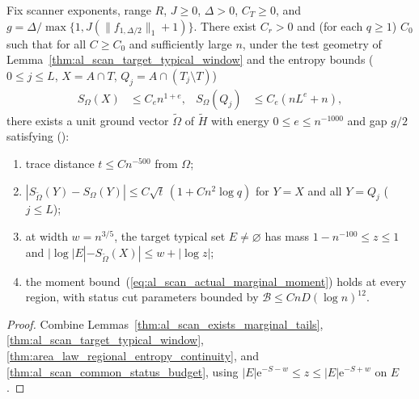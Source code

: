 \begin{lemma}
    \label{thm:al_scan_truncation_inputs}
    \leanok
    Fix scanner exponents, range $R$, $J\ge0$, $\Delta>0$, $C_T\ge0$, and
    $g=\Delta/\max\{1,J(\|f_{1,\Delta/2}\|_1+1)\}$. There exist $C_r>0$ and (for
    each $q\ge1$) $C_0$ such that for all $C\ge C_0$ and sufficiently large $n$,
    under the test geometry of Lemma~\ref{thm:al_scan_target_typical_window}
    and the entropy bounds ($0\le j\le L$, $X=A\cap T$,
    $Q_j=A\cap(T_j\setminus T)$)
    \begin{align}
        S_\Omega(X)   & \le C_en^{1+e},  &
        S_\Omega(Q_j) & \le C_e(nL^e+n),
        \label{eq:al_scan_truncation_entropy_inputs}
    \end{align}
    there exists a unit ground vector $\widetilde\Omega$ of $\widetilde H$ with
    energy $0\le e\le n^{-1000}$ and gap $g/2$ satisfying
    (\cite[Proposition~4.5, Lemmas~2.1 and~3.1, and Proposition~9.2]{OpenAI2026AreaLaw}):
    \begin{enumerate}
        \item trace distance $t\le Cn^{-500}$ from $\Omega$;
        \item $|S_{\widetilde\Omega}(Y)-S_\Omega(Y)|\le C\sqrt t\,(1+Cn^2\log q)$
              for $Y=X$ and all $Y=Q_j$ ($j\le L$);
        \item at width $w=n^{3/5}$, the target typical set $E\ne\varnothing$ has
              mass $1-n^{-100}\le z\le1$ and
              $|\log|E|-S_{\widetilde\Omega}(X)|\le w+|\log z|$;
        \item the moment bound~(\ref{eq:al_scan_actual_marginal_moment}) holds
              at every region, with status cut parameters bounded by
              $\mathcal B\le CnD(\log n)^{12}$.
    \end{enumerate}
\end{lemma}
\begin{proof}\leanok
    Combine Lemmas~\ref{thm:al_scan_exists_marginal_tails},
    \ref{thm:al_scan_target_typical_window},
    \ref{thm:area_law_regional_entropy_continuity}, and
    \ref{thm:al_scan_common_status_budget}, using
    $|E|\mathrm e^{-S-w}\le z\le|E|\mathrm e^{-S+w}$ on $E$.
\end{proof}

